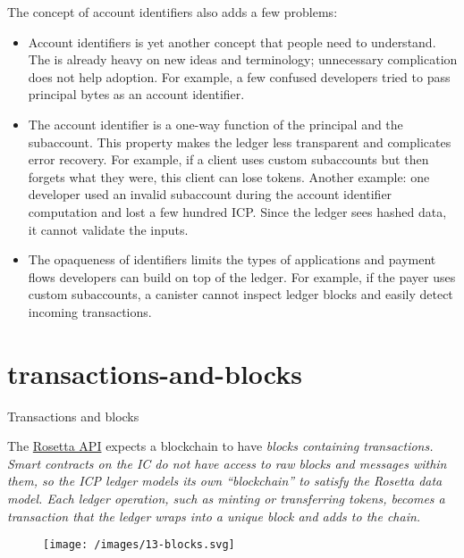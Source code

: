 \documentclass{article}
\begin{document}
The concept of account identifiers also adds a few problems:
\begin{itemize}
  \item
    Account identifiers is yet another concept that people need to understand.
    The  is already heavy on new ideas and terminology; unnecessary complication does not help adoption.
    For example, a few confused developers tried to pass principal bytes as an account identifier.
  \item
    The account identifier is a one-way function of the principal and the subaccount.
    This property makes the ledger less transparent and complicates error recovery.
    For example, if a client uses custom subaccounts but then forgets what they were, this client can lose tokens.
    Another example: one developer used an invalid subaccount during the account identifier computation and lost a few hundred ICP.
    Since the ledger sees hashed data, it cannot validate the inputs.
  \item
    The opaqueness of identifiers limits the types of applications and payment flows developers can build on top of the ledger.
    For example, if the payer uses custom subaccounts, a canister cannot inspect ledger blocks and easily detect incoming transactions.
\end{itemize}

\section{transactions-and-blocks}{Transactions and blocks}

The \href{https://rosetta-api.org}{Rosetta API} expects a blockchain to have \em{blocks} containing \em{transactions}.
Smart contracts on the IC do not have access to raw blocks and messages within them, so the ICP ledger models its own ``blockchain'' to satisfy the Rosetta data model. 
Each ledger operation, such as minting or transferring tokens, becomes a transaction that the ledger wraps into a unique block and adds to the chain.

\begin{figure}[grayscale-diagram]
\texttt{[image: /images/13-blocks.svg]}
\end{figure}
\end{document}
